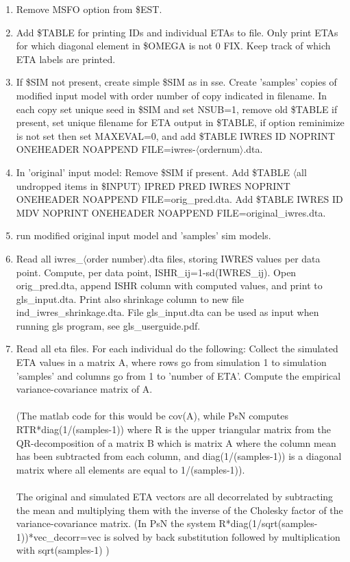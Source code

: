 \documentclass[a4paper,12pt]{article}
\begin{document}
\begin{enumerate}
\item Remove MSFO option from \$EST.
\item Add \$TABLE for printing IDs and individual ETAs to file. Only print ETAs for which diagonal element in \$OMEGA is not 0 FIX. Keep track of which ETA labels are printed.
\item If \$SIM not present, create simple \$SIM as in sse. Create 'samples' copies of modified input model with order number of copy indicated in filename. In each copy set unique seed in \$SIM and set NSUB=1, remove old \$TABLE if present, set unique filename for ETA output in \$TABLE, if option reminimize is not set then set MAXEVAL=0, and add \$TABLE IWRES ID NOPRINT ONEHEADER NOAPPEND FILE=iwres-$\langle$ordernum$\rangle$.dta. 
\item In 'original' input model: Remove \$SIM if present. Add \$TABLE $\langle$all undropped items in \$INPUT$\rangle$ IPRED PRED IWRES NOPRINT ONEHEADER NOAPPEND FILE=orig\_pred.dta. Add \$TABLE IWRES ID MDV NOPRINT ONEHEADER NOAPPEND FILE=original\_iwres.dta. 
\item run modified original input model and 'samples' sim models.
\item Read all iwres\_$\langle$order number$\rangle$.dta files, storing IWRES values per data point. Compute, per data point, ISHR\_ij=1-sd(IWRES\_ij). Open orig\_pred.dta, append ISHR column with computed values, and print to gls\_input.dta. Print also shrinkage column to new file ind\_iwres\_shrinkage.dta. File gls\_input.dta can be used as input when running gls program, see gls\_userguide.pdf.
\item Read all eta files. For each individual do the following: Collect the simulated ETA values in a matrix A, where rows go from simulation 1 to simulation 'samples' and columns go from 1 to 'number of ETA'. Compute the empirical variance-covariance matrix of A. 
\\
\\
(The matlab code for this would be cov(A), while PsN computes RTR*diag(1/(samples-1)) where R is the upper triangular matrix from the QR-decomposition of a matrix B which is matrix A where the column mean has been subtracted from each column,  and diag(1/(samples-1)) is a diagonal matrix where all elements are equal to 1/(samples-1)). 
\\
\\
The original and simulated ETA vectors are all decorrelated by subtracting the mean and multiplying them with the inverse of the Cholesky factor of the variance-covariance matrix. (In PsN the system  R*diag(1/sqrt(samples-1))*vec\_decorr=vec is solved by back substitution followed by multiplication with sqrt(samples-1) )

\end{enumerate}
\end{document}
